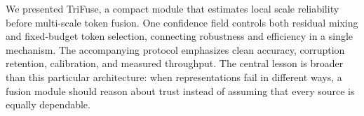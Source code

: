 \documentclass[10pt,twocolumn,letterpaper]{article}
\makeatletter
\newif\ificcvfinal
\newcommand{\method}{TriFuse}
\renewcommand\section{\@startsection{section}{1}{\z@}%
  {-2.2ex \@plus -.5ex \@minus -.2ex}%
  {0.9ex \@plus .2ex}%
  {\normalfont\large\bfseries\color{iccvblue}}}
\makeatother
\begin{document}
We presented \method, a compact module that estimates local scale reliability
before multi-scale token fusion. One confidence field controls both residual
mixing and fixed-budget token selection, connecting robustness and efficiency in
a single mechanism. The accompanying protocol emphasizes clean accuracy,
corruption retention, calibration, and measured throughput. The central lesson
is broader than this particular architecture: when representations fail in
different ways, a fusion module should reason about trust instead of assuming
that every source is equally dependable.

\ificcvfinal
\section*{Acknowledgments}
The authors thank the anonymous reviewers for their constructive feedback.
\fi
\end{document}

